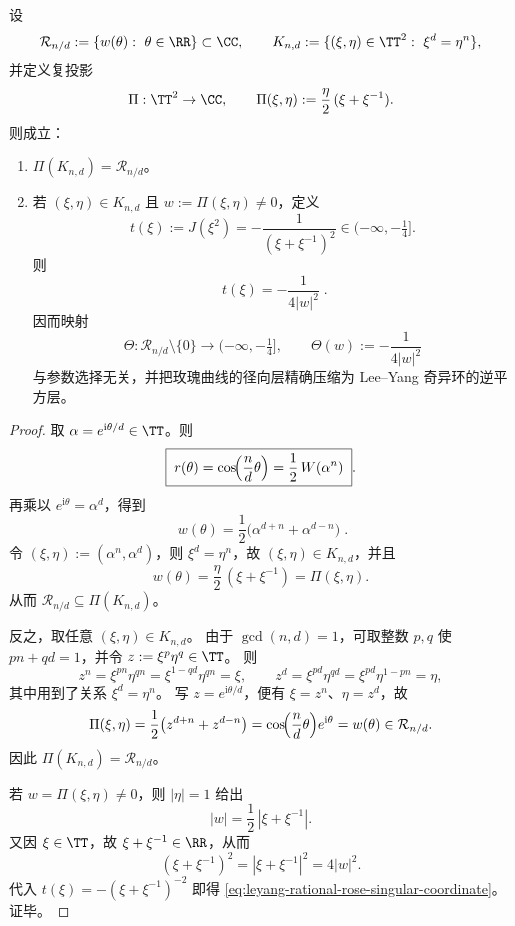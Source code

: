 \begin{theorem}[有理玫瑰曲线的单位圆提升与奇异环坐标反推]\label{thm:leyang-rational-rose-torus-projection}
设
\[
\mathcal R_{n/d}:=\{w(\theta):\ \theta\in\RR\}\subset\CC,\qquad
K_{n,d}:=\{(\xi,\eta)\in\TT^2:\ \xi^d=\eta^n\},
\]
并定义复投影
\[
\Pi:\TT^2\to\CC,\qquad
\Pi(\xi,\eta):=\frac{\eta}{2}\,(\xi+\xi^{-1}).
\]
则成立：
\begin{enumerate}
  \item \(\Pi(K_{n,d})=\mathcal R_{n/d}\)。
  \item 若 \((\xi,\eta)\in K_{n,d}\) 且 \(w:=\Pi(\xi,\eta)\neq 0\)，定义
  \[
  t(\xi):=J(\xi^2)=-\frac{1}{(\xi+\xi^{-1})^2}\in(-\infty,-\tfrac14].
  \]
  则
  \begin{equation}\label{eq:leyang-rational-rose-singular-coordinate}
  \boxed{\;
  t(\xi)=-\frac{1}{4|w|^2}\; }.
  \end{equation}
  因而映射
  \[
  \Theta:\mathcal R_{n/d}\setminus\{0\}\to(-\infty,-\tfrac14],\qquad
  \Theta(w):=-\frac{1}{4|w|^2}
  \]
  与参数选择无关，并把玫瑰曲线的径向层精确压缩为 Lee--Yang 奇异环的逆平方层。
\end{enumerate}
\end{theorem}
\begin{proof}
取 \(\alpha=e^{\mathrm{i}\theta/d}\in\TT\)。则
\begin{equation}\label{eq:leyang-polar-radius-joukowsky}
\boxed{\;
r(\theta)=\cos\!\Bigl(\frac{n}{d}\theta\Bigr)=\frac12\,W(\alpha^n)\; }.
\end{equation}
再乘以 \(e^{\mathrm{i}\theta}=\alpha^d\)，得到
\begin{equation}\label{eq:leyang-polar-position-chord-midpoint}
\boxed{\;
w(\theta)
=
\frac12\bigl(\alpha^{d+n}+\alpha^{d-n}\bigr)\; }.
\end{equation}
令 \((\xi,\eta):=(\alpha^n,\alpha^d)\)，则 \(\xi^d=\eta^n\)，故 \((\xi,\eta)\in K_{n,d}\)，并且
\[
w(\theta)=\frac{\eta}{2}\,(\xi+\xi^{-1})=\Pi(\xi,\eta).
\]
从而 \(\mathcal R_{n/d}\subseteq \Pi(K_{n,d})\)。

反之，取任意 \((\xi,\eta)\in K_{n,d}\)。
由于 \(\gcd(n,d)=1\)，可取整数 \(p,q\) 使 \(pn+qd=1\)，并令 \(z:=\xi^p\eta^q\in\TT\)。
则
\[
z^n=\xi^{pn}\eta^{qn}=\xi^{1-qd}\eta^{qn}=\xi,
\qquad
z^d=\xi^{pd}\eta^{qd}=\xi^{pd}\eta^{1-pn}=\eta,
\]
其中用到了关系 \(\xi^d=\eta^n\)。
写 \(z=e^{\mathrm{i}\theta/d}\)，便有 \(\xi=z^n\)、\(\eta=z^d\)，故
\[
\Pi(\xi,\eta)=\frac12\bigl(z^{d+n}+z^{d-n}\bigr)
=\cos\!\Bigl(\frac{n}{d}\theta\Bigr)e^{\mathrm{i}\theta}
=w(\theta)\in\mathcal R_{n/d}.
\]
因此 \(\Pi(K_{n,d})=\mathcal R_{n/d}\)。

若 \(w=\Pi(\xi,\eta)\neq 0\)，则 \(|\eta|=1\) 给出
\[
|w|=\frac12\,|\xi+\xi^{-1}|.
\]
又因 \(\xi\in\TT\)，故 \(\xi+\xi^{-1}\in\RR\)，从而
\[
(\xi+\xi^{-1})^2=|\xi+\xi^{-1}|^2=4|w|^2.
\]
代入 \(t(\xi)=-(\xi+\xi^{-1})^{-2}\) 即得 \eqref{eq:leyang-rational-rose-singular-coordinate}。证毕。
\end{proof}

